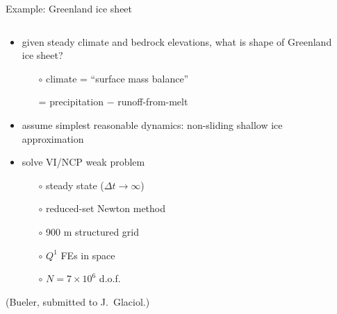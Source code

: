 \documentclass{beamer}
\begin{document}
\begin{frame}{Example: Greenland ice sheet}

\begin{columns}
\begin{column}{0.6\textwidth}
\begin{itemize}
\small
\item given steady climate and bedrock elevations, what is shape of Greenland ice sheet?
  \begin{itemize}
  \scriptsize
  \item[$\circ$] climate = ``surface mass balance''
  \item[] \qquad = precipitation $-$ runoff-from-melt
  \end{itemize}
\small
\item assume simplest reasonable dynamics: non-sliding shallow ice approximation
\item solve VI/NCP weak problem
  \begin{itemize}
  \scriptsize
  \item[$\circ$] steady state ($\Delta t\to \infty$)
  \item[$\circ$] reduced-set Newton method
  \item[$\circ$] 900 m structured grid
  \item[$\circ$] $Q^1$ FEs in space
  \item[$\circ$] $N=7\times 10^6$ d.o.f.
  \end{itemize}
\end{itemize}

\vspace{5mm}
\tiny (Bueler, submitted to J.~Glaciol.)
\end{column}
\begin{column}{0.4\textwidth}
\vspace{-5mm}


\end{column}
\end{columns}
\end{frame}
\end{document}
